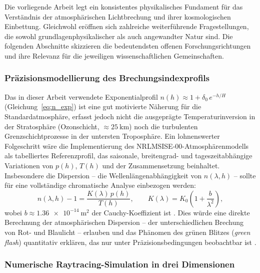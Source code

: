 ﻿\documentclass[12pt,a4paper]{article}
\begin{document}
Die vorliegende Arbeit legt ein konsistentes physikalisches Fundament
für das Verständnis der atmosphärischen Lichtbrechung und ihrer
kosmologischen Einbettung.
Gleichwohl eröffnen sich zahlreiche weiterführende Fragestellungen,
die sowohl grundlagenphysikalischer als auch angewandter Natur sind.
Die folgenden Abschnitte skizzieren die bedeutendsten offenen
Forschungsrichtungen und ihre Relevanz für die jeweiligen wissenschaftlichen
Gemeinschaften.

\subsubsection{Präzisionsmodellierung des Brechungsindexprofils}

Das in dieser Arbeit verwendete Exponentialprofil $n(h) \approx 1 +
\delta_0\,e^{-h/H}$ (Gleichung~\ref{eq:n_exp}) ist eine gut motivierte
Näherung für die Standardatmosphäre, erfasst jedoch nicht die
ausgeprägte Temperaturinversion in der Stratosphäre (Ozonschicht,
$\approx\SI{25}{\kilo\metre}$) noch die turbulenten Grenzschicht\-prozesse
in der untersten Troposphäre.
Ein lohnenswerter Folgeschritt wäre die Implementierung des
NRLMSISE-00-Atmosphärenmodells \citep{Picone2002} als tabelliertes
Referenzprofil, das saisonale, breitengrad- und tageszeit\-abhängige
Variationen von $p(h)$, $T(h)$ und der Zusammensetzung beinhaltet.
Insbesondere die Dispersion -- die Wellenlängenabhängigkeit von
$n(\lambda, h)$ -- sollte für eine vollständige chromatische
Analyse einbezogen werden:
\begin{equation}
  n(\lambda,h) - 1
  = \frac{K(\lambda)\,p(h)}{T(h)},
  \qquad
  K(\lambda) = K_0\!\left(1 + \frac{b}{\lambda^2}\right),
  \label{eq:dispersion}
\end{equation}
wobei $b \approx \SI{1.36e-14}{\metre\squared}$ der
Cauchy-Koeffizient ist \citep{BornWolf1999}.
Dies würde eine direkte Berechnung der atmosphärischen Dispersion
-- der unterschiedlichen Brechung von Rot- und Blaulicht -- erlauben
und das Phänomen des grünen Blitzes (\emph{green flash}) quantitativ
erklären, das nur unter Präzisionsbedingungen beobachtbar ist
\citep{Greenler1980}.

\subsubsection{Numerische Raytracing-Simulation in drei Dimensionen}
\end{document}
